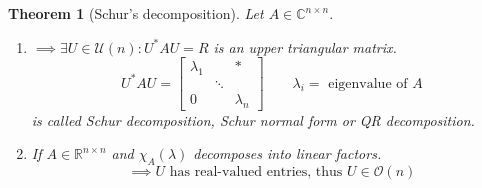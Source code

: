 \documentclass[a4paper]{article}
\newcounter{lecref}[section]
\numberwithin{lecref}{section}
\newtheorem{theorem}[lecref]{Theorem}
\begin{document}
\begin{theorem}[Schur's decomposition] %
  Let $A \in \mathbb C^{n \times n}$.
  \begin{enumerate}
    \item $\implies \exists U \in \mathcal U(n): U^* AU = R$ is an upper triangular matrix.
      \[ U^* AU = \begin{bmatrix} \lambda_1 & & * \\ & \ddots & \\ 0 & & \lambda_n \end{bmatrix} \qquad \lambda_i = \text{ eigenvalue of } A \]
      is called \emph{Schur decomposition}, \emph{Schur normal form} or \emph{QR decomposition}.
    \item If $A \in \mathbb R^{n \times n}$ and $\chi_A(\lambda)$ decomposes into linear factors.
      \[ \implies U \text{ has real-valued entries, thus } U \in \mathcal O(n) \]
  \end{enumerate}
\end{theorem}
\end{document}
